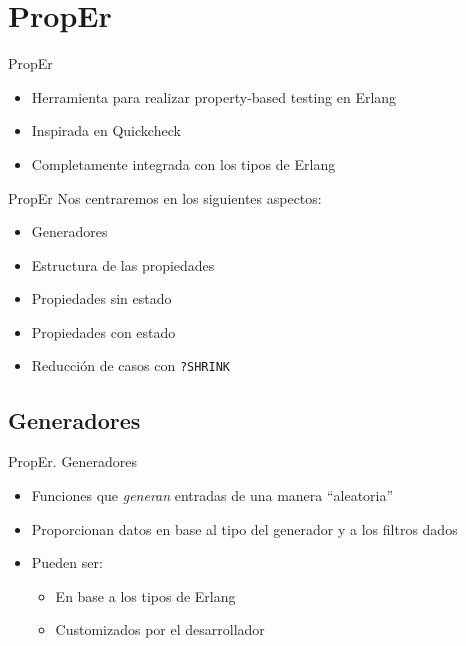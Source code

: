 \documentclass{beamer}
\begin{document}
  \section{PropEr}
    \begin{frame}{PropEr}
      \begin{itemize}
        \item Herramienta para realizar property-based testing en Erlang
        \item Inspirada en Quickcheck
        \item Completamente integrada con los tipos de Erlang
      \end{itemize}
    \end{frame}

    \begin{frame}{PropEr}
      Nos centraremos en los siguientes aspectos:
      \begin{itemize}
        \item Generadores
        \item Estructura de las propiedades
        \item Propiedades sin estado
        \item Propiedades con estado
        \item Reducción de casos con \texttt{?SHRINK}
      \end{itemize}
    \end{frame}


    \subsection{Generadores}
      \begin{frame}{PropEr. Generadores}
        \begin{itemize}
          \item Funciones que \textit{generan} entradas de una manera ``aleatoria''
          \item Proporcionan datos en base al tipo del generador y a los filtros dados
          \item Pueden ser:
          \begin{itemize}
            \item En base a los tipos de Erlang
            \item Customizados por el desarrollador
          \end{itemize}
        \end{itemize}
      \end{frame}
\end{document}
